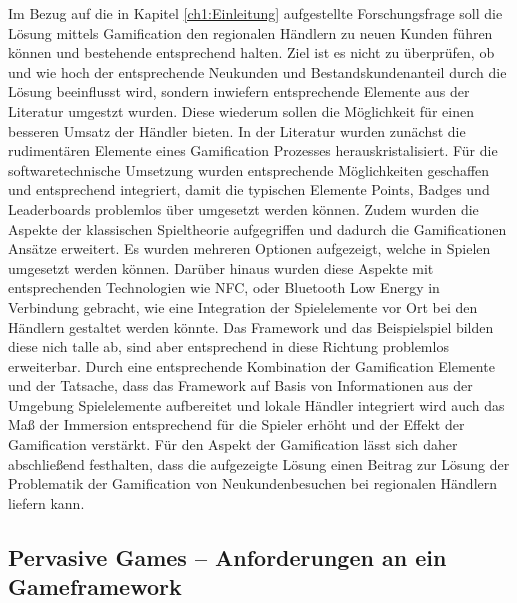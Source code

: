 Im Bezug auf die in Kapitel \ref{ch1:Einleitung} aufgestellte Forschungsfrage soll die Lösung mittels Gamification den regionalen Händlern zu neuen Kunden führen können und bestehende entsprechend halten. Ziel ist es nicht zu überprüfen, ob und wie hoch der entsprechende Neukunden und Bestandskundenanteil durch die Lösung beeinflusst wird, sondern inwiefern entsprechende Elemente aus der Literatur umgestzt wurden. Diese wiederum sollen die Möglichkeit für einen besseren Umsatz der Händler bieten.
In der Literatur wurden zunächst die rudimentären Elemente eines Gamification Prozesses herauskristalisiert. Für die softwaretechnische Umsetzung wurden entsprechende Möglichkeiten geschaffen und entsprechend integriert, damit die typischen Elemente Points, Badges und Leaderboards problemlos über umgesetzt werden können. Zudem wurden die Aspekte der klassischen Spieltheorie aufgegriffen und dadurch die Gamificationen Ansätze erweitert. Es wurden mehreren Optionen aufgezeigt, welche in Spielen umgesetzt werden können. Darüber hinaus wurden diese Aspekte mit entsprechenden Technologien wie NFC, oder Bluetooth Low Energy in Verbindung gebracht, wie eine Integration der Spielelemente vor Ort bei den Händlern gestaltet werden könnte. Das Framework und das Beispielspiel bilden diese nich talle ab, sind aber entsprechend in diese Richtung problemlos erweiterbar.
Durch eine entsprechende Kombination der Gamification Elemente und der Tatsache, dass das Framework auf Basis von Informationen aus der Umgebung Spielelemente aufbereitet und lokale Händler integriert wird auch das Maß der Immersion entsprechend für die Spieler erhöht und der Effekt der Gamification verstärkt.
Für den Aspekt der Gamification lässt sich daher abschließend festhalten, dass die aufgezeigte Lösung einen Beitrag zur Lösung der Problematik der Gamification von Neukundenbesuchen bei regionalen Händlern liefern kann.

\subsection*{Pervasive Games  -- Anforderungen an ein Gameframework}

